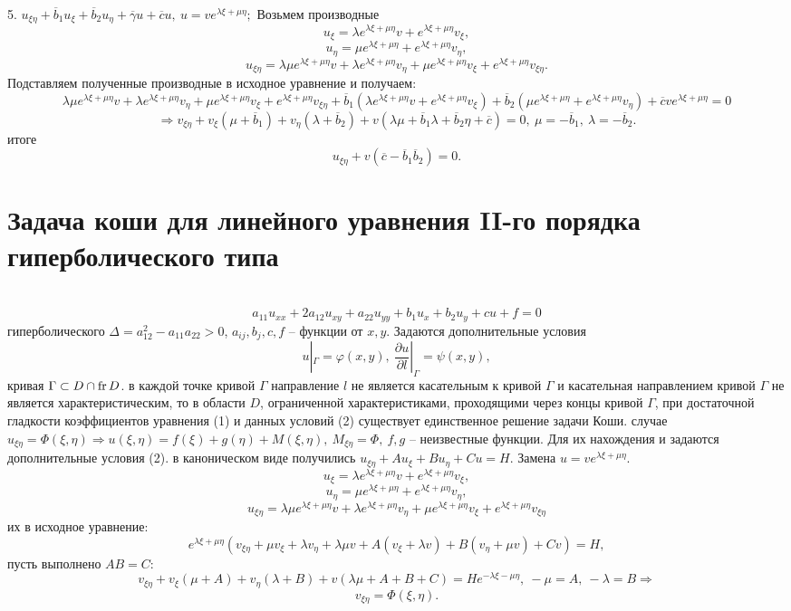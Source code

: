 \documentclass[9pt]{article}
\begin{document}
\par5. \(u_{\xi\eta}+\overline b_1u_\xi+\overline b_2u_\eta+\overline\gamma u+\overline cu,\ u=ve^{\lambda\xi+\mu\eta};\) Возьмем производные \[u_\xi=\lambda e^{\lambda\xi+\mu\eta}v+e^{\lambda\xi+\mu\eta}v_\xi,\]
\[u_\eta=\mu e^{\lambda\xi+\mu\eta}+e^{\lambda\xi+\mu\eta}v_\eta,\] \[u_{\xi\eta}=\lambda\mu e^{\lambda\xi+\mu\eta}v+\lambda e^{\lambda\xi+\mu\eta}v_\eta+\mu e^{\lambda\xi+\mu\eta}v_\xi+e^{\lambda\xi+\mu\eta}v_{\xi\eta}.\] Подставляем полученные производные в исходное уравнение и получаем: 
\[\lambda\mu e^{\lambda\xi+\mu\eta}v+\lambda e^{\lambda\xi+\mu\eta}v_\eta+\mu e^{\lambda\xi+\mu\eta}v_\xi+e^{\lambda\xi+\mu\eta}v_{\xi\eta}+\overline b_1(\lambda e^{\lambda\xi+\mu\eta}v+e^{\lambda\xi+\mu\eta}v_\xi)+\overline b_2(\mu e^{\lambda\xi+\mu\eta}+e^{\lambda\xi+\mu\eta}v_\eta)+\overline cve^{\lambda\xi+\mu\eta}=0\]
\[\Rightarrow v_{\xi\eta}+v_{\xi}(\mu+\overline b_1)+v_\eta(\lambda+\overline b_2)+v(\lambda\mu+\overline b_1\lambda+\overline b_2\eta+\overline c)=0,\ \mu=-\overline b_1,\ \lambda =-\overline b_2.\]
 итоге
\[u_{\xi\eta}+v(\overline c - \overline b_1\overline b_2)=0.\]

\section{Задача коши для линейного уравнения II-го порядка гиперболического типа}

\ 
\begin{equation}
a_{11}u_{xx}+2a_{12}u_{xy}+a_{22}u_{yy}+b_1u_x+b_2u_y+cu+f=0
\end{equation}
 гиперболического \(\Delta = a_{12}^2-a_{11}a_{22}>0\), \(a_{ij},b_j, c, f\) -- функции от \(x, y\). Задаются дополнительные условия 
\begin{equation}
    u|_\Gamma=\varphi(x,y),\ \dfrac{\partial u}{\partial l}|_\Gamma=\psi(x,y), 
\end{equation} кривая \(\Gamma\subset D\cap \operatorname{fr} D\).
 в каждой точке кривой \(\Gamma\) направление \(l\) не является касательным к кривой \(\Gamma\) и касательная направлением кривой \(\Gamma\) не является характеристическим, то в области \(D\), ограниченной характеристиками, проходящими через концы кривой \(\Gamma\), при достаточной гладкости коэффициентов уравнения (1) и данных условий (2) существует единственное решение задачи Коши.
\parВ случае \(u_{\xi\eta}=\Phi(\xi,\eta)\Rightarrow u(\xi,\eta)=f(\xi)+g(\eta)+M(\xi,\eta),\ M_{\xi\eta}=\Phi,\ f, g\) -- неизвестные функции. Для их нахождения и задаются дополнительные условия (2).
\parПусть в каноническом виде получились \(u_{\xi\eta}+Au_\xi+Bu_\eta+Cu=H\). Замена \(u=ve^{\lambda\xi+\mu\eta}\).
\[u_\xi=\lambda e^{\lambda\xi+\mu\eta}v+e^{\lambda\xi+\mu\eta}v_\xi,\]
\[u_\eta=\mu e^{\lambda\xi+\mu\eta}+e^{\lambda\xi+\mu\eta}v_\eta,\]
\[u_{\xi\eta}=\lambda\mu e^{\lambda\xi+\mu\eta}v+\lambda e^{\lambda\xi+\mu\eta}v_\eta+\mu e^{\lambda\xi+\mu\eta}v_\xi+e^{\lambda\xi+\mu\eta}v_{\xi\eta}\]
\parПодставим их в исходное уравнение:
\[e^{\lambda\xi+\mu\eta}(v_{\xi\eta}+\mu v_\xi+\lambda v_\eta +\lambda\mu v+A(v_\xi+\lambda v)+B(v_\eta+\mu v)+Cv)=H,\]
\parИ пусть выполнено \(AB=C\):
\[v_{\xi\eta}+v_\xi(\mu+A)+v_\eta(\lambda+B) +v(\lambda\mu+A+B+C)=He^{-\lambda\xi-\mu\eta},\ -\mu=A,\ -\lambda=B\Rightarrow\]
\[v_{\xi\eta}=\Phi(\xi,\eta).\]
\end{document}
